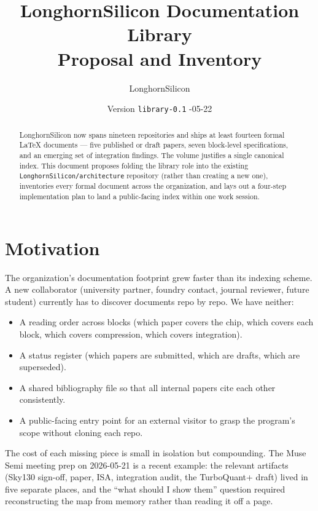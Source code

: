 \documentclass[11pt]{article}
\title{\textbf{LonghornSilicon Documentation Library \\
Proposal and Inventory}}
\author{LonghornSilicon}
\date{Version \texttt{library-0.1} \quad 2026-05-22}
\begin{document}
\maketitle
\thispagestyle{fancy}

\begin{abstract}
\noindent
LonghornSilicon now spans nineteen repositories and ships at least
fourteen formal LaTeX documents --- five published or draft papers,
seven block-level specifications, and an emerging set of integration
findings. The volume justifies a single canonical index. This
document proposes folding the library role into the existing
\texttt{LonghornSilicon/architecture} repository (rather than creating
a new one), inventories every formal document across the
organization, and lays out a four-step implementation plan to land
a public-facing index within one work session.
\end{abstract}

\section{Motivation}

The organization's documentation footprint grew faster than its
indexing scheme. A new collaborator (university partner, foundry
contact, journal reviewer, future student) currently has to discover
documents repo by repo. We have neither:

\begin{itemize}
\item A reading order across blocks (which paper covers the chip,
which covers each block, which covers compression, which covers
integration).
\item A status register (which papers are submitted, which are drafts,
which are superseded).
\item A shared bibliography file so that all internal papers cite each
other consistently.
\item A public-facing entry point for an external visitor to grasp
the program's scope without cloning each repo.
\end{itemize}

The cost of each missing piece is small in isolation but compounding.
The Muse Semi meeting prep on 2026-05-21 is a recent example: the
relevant artifacts (Sky130 sign-off, paper, ISA, integration audit,
the TurboQuant+ draft) lived in five separate places, and the
``what should I show them'' question required reconstructing the map
from memory rather than reading it off a page.
\end{document}
